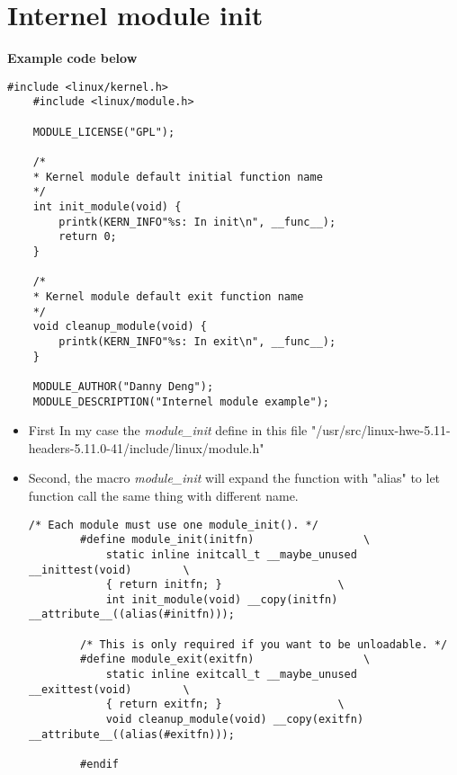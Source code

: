 \section{Internel module init}

\textbf{Example code below}
\begin{lstlisting}[style=CStyle]
    #include <linux/kernel.h>
    #include <linux/module.h>
    
    MODULE_LICENSE("GPL");
    
    /*
    * Kernel module default initial function name
    */
    int init_module(void) {
        printk(KERN_INFO"%s: In init\n", __func__);
        return 0;
    }
    
    /*
    * Kernel module default exit function name
    */
    void cleanup_module(void) {
        printk(KERN_INFO"%s: In exit\n", __func__);
    }
    
    MODULE_AUTHOR("Danny Deng");
    MODULE_DESCRIPTION("Internel module example");     
\end{lstlisting}

\begin{itemize}
    \item First
    In my case the \textit{module\_init} define in this file \newline
    "/usr/src/linux-hwe-5.11-headers-5.11.0-41/include/linux/module.h"
    \item Second, the macro \textit{module\_init} will expand the function with "alias" to let function call the same thing with different name.
    \begin{lstlisting}[style=CStyle]
        /* Each module must use one module_init(). */
        #define module_init(initfn)					\
            static inline initcall_t __maybe_unused __inittest(void)		\
            { return initfn; }					\
            int init_module(void) __copy(initfn) __attribute__((alias(#initfn)));
        
        /* This is only required if you want to be unloadable. */
        #define module_exit(exitfn)					\
            static inline exitcall_t __maybe_unused __exittest(void)		\
            { return exitfn; }					\
            void cleanup_module(void) __copy(exitfn) __attribute__((alias(#exitfn)));
        
        #endif           
    \end{lstlisting}
\end{itemize}


